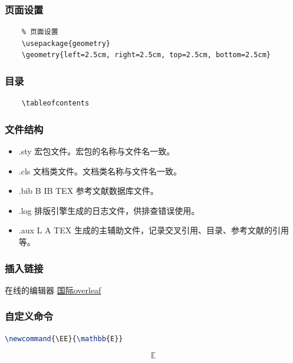 \documentclass[11pt]{ctexart}
\newcommand{\EE}{\mathbb{E}}
\begin{document}
 \subsubsection{页面设置}
 \begin{lstlisting}
 	% 页面设置
 	\usepackage{geometry}
 	\geometry{left=2.5cm, right=2.5cm, top=2.5cm, bottom=2.5cm}
 \end{lstlisting}
 
 \subsubsection{目录}
 
 \begin{lstlisting}
 	\tableofcontents
 \end{lstlisting}
 
 \subsubsection{文件结构}
 
 \begin{itemize}
 	\item .sty 宏包文件。宏包的名称与文件名一致。
 	\item .cls 文档类文件。文档类名称与文件名一致。
 	\item .bib B IB TEX 参考文献数据库文件。
 	\item .log 排版引擎生成的日志文件，供排查错误使用。
 	\item .aux L A TEX 生成的主辅助文件，记录交叉引用、目录、参考文献的引用等。
 \end{itemize}
 

 
 \subsubsection{插入链接}
 
  在线的编辑器 \href{www.overleaf.com}{国际overleaf}
 
 \subsubsection{自定义命令}
 
 \begin{lstlisting}[language=tex]
 	\newcommand{\EE}{\mathbb{E}}
 \end{lstlisting}

\begin{equation}
	\mathbb{E}
\end{equation}
\end{document}
